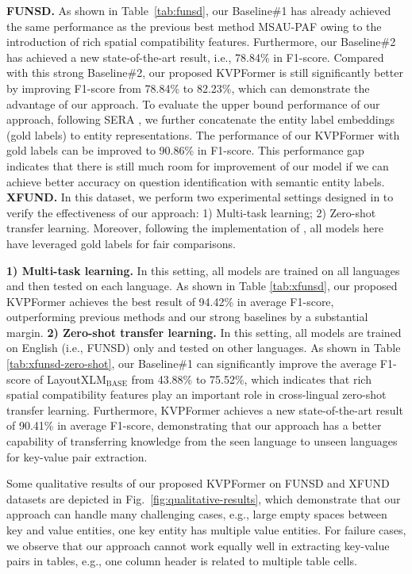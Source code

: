 \documentclass[letterpaper]{article} %
\def \Ours {KVPFormer}
\begin{document}
\textbf{FUNSD.}
As shown in Table~\ref{tab:funsd}, our Baseline\#1 has already achieved the same performance as the previous best method MSAU-PAF owing to the introduction of rich spatial compatibility features. Furthermore, our Baseline\#2 has achieved a new state-of-the-art result, i.e., 78.84\% in F1-score. Compared with this strong Baseline\#2, our proposed \Ours{} is still significantly better by improving F1-score from 78.84\% to 82.23\%, which can demonstrate the advantage of our approach. To evaluate the upper bound performance of our approach, following SERA \cite{zhang2021entity}, we further concatenate the entity label embeddings (gold labels) to entity representations. The performance of our \Ours{} with gold labels can be improved to 90.86\% in F1-score. This performance gap indicates that there is still much room for improvement of our model if we can achieve better accuracy on question identification with semantic entity labels.  \textbf{XFUND.} In this dataset, we perform two experimental settings designed in \cite{xu2021layoutxlm} to verify the effectiveness of our approach: 1) Multi-task learning; 2) Zero-shot transfer learning. Moreover, following the implementation of \cite{xu2021layoutxlm}, all models here have leveraged gold labels for fair comparisons.

\textbf{1) Multi-task learning.} In this setting, all models are trained on all languages and then tested on each language. As shown in Table \ref{tab:xfunsd}, our proposed \Ours{} achieves the best result of 94.42\% in average F1-score, outperforming previous methods and our strong baselines by a substantial margin.  \textbf{2) Zero-shot transfer learning.} In this setting, all models are trained on English (i.e., FUNSD) only and tested on other languages. As shown in Table \ref{tab:xfunsd-zero-shot}, our Baseline\#1 can significantly improve the average F1-score of LayoutXLM$_{\mathrm{BASE}}$ from 43.88\% to 75.52\%, which indicates that rich spatial compatibility features play an important role in cross-lingual zero-shot transfer learning. Furthermore, \Ours{} achieves a new state-of-the-art result of 90.41\% in average F1-score, demonstrating that our approach has a better capability of transferring knowledge from the seen language to unseen languages for key-value pair extraction.


Some qualitative results of our proposed KVPFormer on FUNSD and XFUND datasets are depicted in Fig.~\ref{fig:qualitative-results}, which demonstrate that our approach can handle many challenging cases, e.g., large empty spaces between key and value entities, one key entity has multiple value entities. For failure cases, we observe that our approach cannot work equally well in extracting key-value pairs in tables, e.g., one column header is related to multiple table cells.
\end{document}
